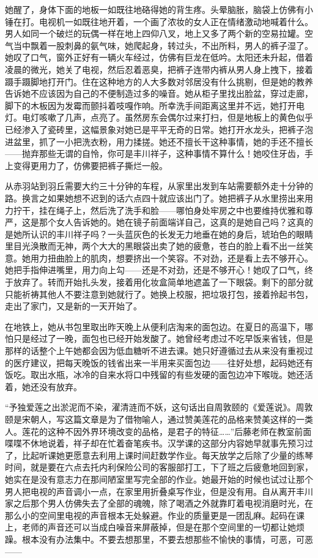 \documentclass{article}
\begin{document}
她醒了，身体下面的地板一如既往地硌得她的背生疼。头晕脑胀，脑袋上仿佛有小锤在打。电视机一如既往地开着，一个画了浓妆的女人正在情绪激动地喊着什么。男人如同一个破烂的玩偶一样在地上四仰八叉，地上又多了两个新的空易拉罐。空气当中飘着一股刺鼻的氨气味，她爬起身，转过头，不出所料，男人的裤子湿了。她叹了口气，窗外正好有一辆火车经过，仿佛有巨龙在低吟。太阳还未升起，借着凌晨的微光，她关了电视，然后忍着恶臭，把裤子连带内裤从男人身上拽下，接着蹑手蹑脚地打开门。住在这种地方的人大多数对邻居没有什么挑剔，但是她的教养告诉她不应该因为自己的不便制造过多的噪音。她从柜子里找出脸盆，穿过走廊，脚下的木板因为发霉而颤抖着吱嘎作响。所幸洗手间距离这里并不远，她打开电灯。电灯咳嗽了几声，点亮了。虽然房东会偶尔过来打扫，但是地板上的黄色似乎已经渗入了瓷砖里，这幅景象对她已是平平无奇的日常。她打开水龙头，把裤子泡进盆里，抓了一小把洗衣粉，用力揉搓。她还不擅长干这种事情，她的手还不擅长——抛弃那些无谓的自怜，你可是丰川祥子，这种事情不算什么！她咬住牙齿，手上变得更用力了，仿佛要把裤子撕烂一般。



从赤羽站到羽丘需要大约三十分钟的车程，从家里出发到车站需要额外走十分钟的路。换言之如果她想不迟到的话六点四十就应该出门了。她把裤子从水里捞出来用力拧干，挂在绳子上，然后洗了洗手和脸——哪怕身处牢房之中也要维持优雅和尊严，这是那个女人告诉她的。她在镜子前面端详自己，这真的是她自己吗？这真的是她所认识的丰川祥子吗？一头蓝灰色的长发无力地垂在她的身后，琥珀色的眼睛里目光涣散而无神，两个大大的黑眼袋出卖了她的疲惫，苍白的脸上看不出一丝笑意。她用力扭曲脸上的肌肉，想要挤出一个笑容。不对劲，还是看上去不够开心。她把手指伸进嘴里，用力向上勾——还是不对劲，还是不够开心！她叹了口气，终于放弃了。转而开始扎头发，接着用化妆盒简单地遮盖了一下眼袋。剩下的部分就只能祈祷其他人不要注意到她就行了。她换上校服，把垃圾打包，接着拎起书包，走出了家门，又是新的一天开始了。



在地铁上，她从书包里取出昨天晚上从便利店淘来的面包边。在夏日的高温下，哪怕只是经过了一晚，面包也已经开始发酸了。她曾经考虑过不吃早饭来省钱，但是那样的话整个上午她都会因为低血糖听不进去课。她只好遵循过去从来没有重视过的医疗建议，把每天晚饭的钱省出来一半用来买面包边——往好处想，起码她还有饭吃。取出水瓶，冰冷的自来水将口中残留的有些发硬的面包边冲下喉咙。她还活着，她还没有放弃。



“予独爱莲之出淤泥而不染，濯清涟而不妖，这句话出自周敦颐的《爱莲说》。周敦颐是宋朝人，写这篇文章是为了借物喻人，通过赞美莲花的品格来赞美这样的一类人。莲花的这种不因外界环境改变的品格，是君子的特征……”后藤老师在教室前面喋喋不休地说着，祥子却在忙着奋笔疾书。汉学课的这部分内容她早就事先预习过了，比起听课她更愿意去利用上课时间赶数学作业。每天放学之后除了少量的练琴时间，就是要在六点去托内利保险公司的客服部打工，下了班之后疲惫地回到家，她实在是没有意志力在那间陋室里写完全部的作业。她最开始的时候也试过让那个男人把电视的声音调小一点，在家里用折叠桌写作业，但是没有用。自从离开丰川家之后那个男人仿佛失去了全部的魂魄，除了喝酒之外就靠盯着电视消磨时光，在那么小的空间里电视的声音根本无处躲避。作业的质量更是一团乱麻。起码在课上，老师的声音还可以当成白噪音来屏蔽掉，但是在那个空间里的一切都让她烦躁。根本没有办法集中。不要去想那里，不要去想那些不愉快的事情，可恶，可恶——
\end{document}
